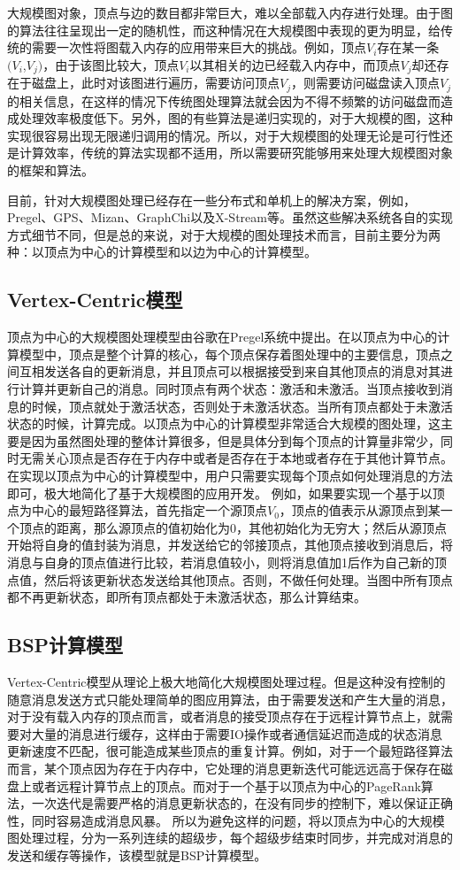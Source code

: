 大规模图对象，顶点与边的数目都非常巨大，难以全部载入内存进行处理。由于图的算法往往呈现出一定的随机性，而这种情况在大规模图中表现的更为明显，给传统的需要一次性将图载入内存的应用带来巨大的挑战。例如，顶点$V_i$存在某一条$(V_i$,$V_j)$，由于该图比较大，顶点$V_i$以其相关的边已经载入内存中，而顶点$V_j$却还存在于磁盘上，此时对该图进行遍历，需要访问顶点$V_j$，则需要访问磁盘读入顶点$V_j$的相关信息，在这样的情况下传统图处理算法就会因为不得不频繁的访问磁盘而造成处理效率极度低下。另外，图的有些算法是递归实现的，对于大规模的图，这种实现很容易出现无限递归调用的情况。所以，对于大规模图的处理无论是可行性还是计算效率，传统的算法实现都不适用，所以需要研究能够用来处理大规模图对象的框架和算法。

目前，针对大规模图处理已经存在一些分布式和单机上的解决方案，例如，Pregel、GPS、Mizan、GraphChi以及X-Stream等。虽然这些解决系统各自的实现方式细节不同，但是总的来说，对于大规模的图处理技术而言，目前主要分为两种：以顶点为中心的计算模型和以边为中心的计算模型。

\subsection{Vertex-Centric模型}
顶点为中心的大规模图处理模型由谷歌在Pregel系统中提出。在以顶点为中心的计算模型中，顶点是整个计算的核心，每个顶点保存着图处理中的主要信息，顶点之间互相发送各自的更新消息，并且顶点可以根据接受到来自其他顶点的消息对其进行计算并更新自己的消息。同时顶点有两个状态：激活和未激活。当顶点接收到消息的时候，顶点就处于激活状态，否则处于未激活状态。当所有顶点都处于未激活状态的时候，计算完成。以顶点为中心的计算模型非常适合大规模的图处理，这主要是因为虽然图处理的整体计算很多，但是具体分到每个顶点的计算量非常少，同时无需关心顶点是否存在于内存中或者是否存在于本地或者存在于其他计算节点。在实现以顶点为中心的计算模型中，用户只需要实现每个顶点如何处理消息的方法即可，极大地简化了基于大规模图的应用开发。
例如，如果要实现一个基于以顶点为中心的最短路径算法，首先指定一个源顶点$V_0$，顶点的值表示从源顶点到某一个顶点的距离，那么源顶点的值初始化为0，其他初始化为无穷大；然后从源顶点开始将自身的值封装为消息，并发送给它的邻接顶点，其他顶点接收到消息后，将消息与自身的顶点值进行比较，若消息值较小，则将消息值加1后作为自己新的顶点值，然后将该更新状态发送给其他顶点。否则，不做任何处理。当图中所有顶点都不再更新状态，即所有顶点都处于未激活状态，那么计算结束。

\subsection{BSP计算模型}
Vertex-Centric模型从理论上极大地简化大规模图处理过程。但是这种没有控制的随意消息发送方式只能处理简单的图应用算法，由于需要发送和产生大量的消息，对于没有载入内存的顶点而言，或者消息的接受顶点存在于远程计算节点上，就需要对大量的消息进行缓存，这样由于需要IO操作或者通信延迟而造成的状态消息更新速度不匹配，很可能造成某些顶点的重复计算。例如，对于一个最短路径算法而言，某个顶点因为存在于内存中，它处理的消息更新迭代可能远远高于保存在磁盘上或者远程计算节点上的顶点。而对于一个基于以顶点为中心的PageRank算法，一次迭代是需要严格的消息更新状态的，在没有同步的控制下，难以保证正确性，同时容易造成消息风暴。
所以为避免这样的问题，将以顶点为中心的大规模图处理过程，分为一系列连续的超级步，每个超级步结束时同步，并完成对消息的发送和缓存等操作，该模型就是BSP计算模型。

